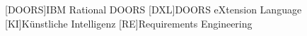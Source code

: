 
\begin{acronym}
	[DOORS]{IBM Rational DOORS}
	[DXL]{DOORS eXtension Language}
	[KI]{Künstliche Intelligenz}
	[RE]{Requirements Engineering}
\end{acronym}


